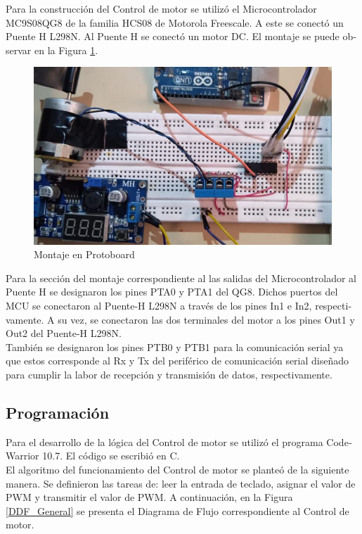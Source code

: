 \documentclass[journal]{IEEEtran}
\begin{document}
\begin{otherlanguage}{spanish}
Para la construcción del Control de motor se utilizó el Microcontrolador MC9S08QG8 de la familia HCS08 de Motorola Freescale. A este se conectó un Puente H L298N. Al Puente H se conectó un motor DC. El montaje se puede observar en la Figura \ref{M}.

\begin{figure}[H]
    \centering
    \includegraphics[scale=0.28]{Imágenes/Montaje_Practica_6.jpeg}
    \caption{Montaje en Protoboard}
    \label{M}
\end{figure}

Para la sección del montaje correspondiente al las salidas del Microcontrolador al Puente H se designaron los pines PTA0 y PTA1 del QG8. Dichos puertos del MCU se conectaron al Puente-H L298N a través de los pines In1 e In2, respectivamente. A su vez, se conectaron las dos terminales del motor a los pines Out1 y Out2 del Puente-H L298N.\\

También se designaron los pines PTB0 y PTB1 para la comunicación serial ya que estos corresponde al Rx y Tx del periférico de comunicación serial diseñado para cumplir la labor de recepción y transmisión de datos, respectivamente.

\subsection{Programación}

Para el desarrollo de la lógica del Control de motor se utilizó el programa CodeWarrior 10.7. El código se escribió en C.\\

El algoritmo del funcionamiento del Control de motor se planteó de la siguiente manera. Se definieron las tareas de: leer la entrada de teclado, asignar el valor de PWM y transmitir el valor de PWM. A continuación, en la Figura \ref{DDF_General} se presenta el Diagrama de Flujo correspondiente al Control de motor.


\end{otherlanguage}
\end{document}
